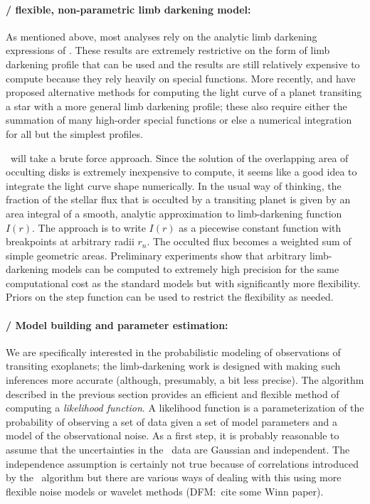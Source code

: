 \documentclass[letterpaper,12pt,preprint]{hack_aastex}
\newcommand{\Untrendy}{\package{Untrendy}}
\newcommand{\Bart}{\package{Bart}}
\begin{document}
\paragraph{\Bart / flexible, non-parametric limb darkening model:}
As mentioned above, most analyses rely on the
analytic limb darkening expressions of \citet{mandel}.
These results are extremely restrictive on the form of limb darkening profile
that can be used and the results are still relatively expensive to compute
because they rely heavily on special functions.
More recently, \citet{crazyass1} and \citet{crazyass2} have proposed
alternative methods for computing the light curve of a planet transiting a
star with a more general limb darkening profile; these also require
either the summation of many
high-order special functions or else a numerical integration for
all but the simplest profiles.

\Bart\ will take a brute force approach.
Since the solution of the overlapping area of occulting disks is extremely
inexpensive to compute, it seems like a good idea to integrate the light curve
shape numerically.
In the usual way of thinking, the fraction of the stellar flux
that is occulted by a transiting planet is given by an 
area integral of a smooth, analytic approximation to limb-darkening function $I(r)$.
The \Bart approach is to write $I(r)$ as a piecewise constant function
with breakpoints at arbitrary radii $r_n$.  The occulted flux becomes a
weighted sum of simple geometric areas.
Preliminary experiments show that arbitrary limb-darkening models can be computed to
extremely high precision for the same computational cost as the standard
\citet{mandel} models but with significantly more flexibility.
Priors on the step function can be used to restrict the flexibility as needed.

\paragraph{\Bart / Model building and parameter estimation:}
We are specifically interested in the probabilistic modeling
of observations of transiting exoplanets; the limb-darkening work is designed with making such inferences more accurate (although, presumably, a bit less precise).
The algorithm described in the previous section provides an efficient and
flexible method of computing a \textit{likelihood function}.
A likelihood function is a parameterization of the probability of observing a
set of data given a set of model parameters and a model of the observational
noise.
As a first step, it is probably reasonable to assume that the uncertainties in
the \Kepler\ data are Gaussian and independent.
The independence assumption is certainly not true because of correlations
introduced by the \Untrendy\ algorithm but there are various ways of dealing
with this using more flexible noise models or wavelet methods (DFM:\ cite some
Winn paper).
\end{document}
